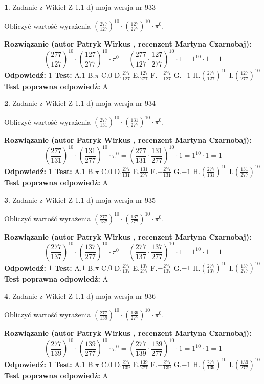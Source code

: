 \documentclass[12pt, a4paper]{article}
\theoremstyle{definition} %
\newtheorem{zad}{}
\newcommand{\zadStart}[1]{\begin{zad}#1\newline}
\newcommand{\zadStop}{\end{zad}}
\newcommand{\rozwStart}[2]{\noindent \textbf{Rozwiązanie (autor #1 , recenzent #2): }\newline}
\newcommand{\rozwStop}{\newline}
\newcommand{\odpStart}{\noindent \textbf{Odpowiedź:}\newline}
\newcommand{\odpStop}{\newline}
\newcommand{\testStart}{\noindent \textbf{Test:}\newline}
\newcommand{\testStop}{\newline}
\newcommand{\kluczStart}{\noindent \textbf{Test poprawna odpowiedź:}\newline}
\newcommand{\kluczStop}{\newline}
\begin{document}
\zadStart{Zadanie z Wikieł Z 1.1 d) moja wersja nr 933}

Obliczyć wartość wyrażenia $(\frac{277}{127})^{10} \cdot (\frac{127}{277})^{10} \cdot \pi^{0}$.
\zadStop
\rozwStart{Patryk Wirkus}{Martyna Czarnobaj}
$$(\frac{277}{127})^{10} \cdot (\frac{127}{277})^{10} \cdot \pi^{0} = (\frac{277}{127} \cdot \frac{127}{277})^{10} \cdot 1 = 1^{10} \cdot 1 = 1$$
\rozwStop
\odpStart
$1$
\odpStop
\testStart
A.$1$ B.$\pi$ C.$0$ D.$\frac{277}{127}$ E.$\frac{127}{277}$
F.$-\frac{277}{127}$ G.$-1$
H.$(\frac{277}{127})^{10}$
I.$(\frac{127}{277})^{10}$
\testStop
\kluczStart
A
\kluczStop



\zadStart{Zadanie z Wikieł Z 1.1 d) moja wersja nr 934}

Obliczyć wartość wyrażenia $(\frac{277}{131})^{10} \cdot (\frac{131}{277})^{10} \cdot \pi^{0}$.
\zadStop
\rozwStart{Patryk Wirkus}{Martyna Czarnobaj}
$$(\frac{277}{131})^{10} \cdot (\frac{131}{277})^{10} \cdot \pi^{0} = (\frac{277}{131} \cdot \frac{131}{277})^{10} \cdot 1 = 1^{10} \cdot 1 = 1$$
\rozwStop
\odpStart
$1$
\odpStop
\testStart
A.$1$ B.$\pi$ C.$0$ D.$\frac{277}{131}$ E.$\frac{131}{277}$
F.$-\frac{277}{131}$ G.$-1$
H.$(\frac{277}{131})^{10}$
I.$(\frac{131}{277})^{10}$
\testStop
\kluczStart
A
\kluczStop



\zadStart{Zadanie z Wikieł Z 1.1 d) moja wersja nr 935}

Obliczyć wartość wyrażenia $(\frac{277}{137})^{10} \cdot (\frac{137}{277})^{10} \cdot \pi^{0}$.
\zadStop
\rozwStart{Patryk Wirkus}{Martyna Czarnobaj}
$$(\frac{277}{137})^{10} \cdot (\frac{137}{277})^{10} \cdot \pi^{0} = (\frac{277}{137} \cdot \frac{137}{277})^{10} \cdot 1 = 1^{10} \cdot 1 = 1$$
\rozwStop
\odpStart
$1$
\odpStop
\testStart
A.$1$ B.$\pi$ C.$0$ D.$\frac{277}{137}$ E.$\frac{137}{277}$
F.$-\frac{277}{137}$ G.$-1$
H.$(\frac{277}{137})^{10}$
I.$(\frac{137}{277})^{10}$
\testStop
\kluczStart
A
\kluczStop



\zadStart{Zadanie z Wikieł Z 1.1 d) moja wersja nr 936}

Obliczyć wartość wyrażenia $(\frac{277}{139})^{10} \cdot (\frac{139}{277})^{10} \cdot \pi^{0}$.
\zadStop
\rozwStart{Patryk Wirkus}{Martyna Czarnobaj}
$$(\frac{277}{139})^{10} \cdot (\frac{139}{277})^{10} \cdot \pi^{0} = (\frac{277}{139} \cdot \frac{139}{277})^{10} \cdot 1 = 1^{10} \cdot 1 = 1$$
\rozwStop
\odpStart
$1$
\odpStop
\testStart
A.$1$ B.$\pi$ C.$0$ D.$\frac{277}{139}$ E.$\frac{139}{277}$
F.$-\frac{277}{139}$ G.$-1$
H.$(\frac{277}{139})^{10}$
I.$(\frac{139}{277})^{10}$
\testStop
\kluczStart
A
\kluczStop
\end{document}
